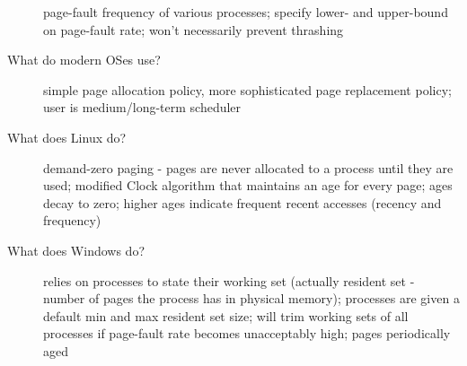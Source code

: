 \documentclass[10pt]{article}
\begin{document}
\begin{description}
  page-fault frequency of various processes;
  specify lower- and upper-bound on page-fault rate;
  won't necessarily prevent thrashing
\item[What do modern OSes use?]
  simple page allocation policy, more sophisticated page replacement policy;
  user is medium/long-term scheduler
\item[What does Linux do?]
  demand-zero paging - pages are never allocated to a process until they are used;
  modified Clock algorithm that maintains an age for every page;
  ages decay to zero; higher ages indicate frequent recent accesses (recency and frequency)
\item[What does Windows do?]
  relies on processes to state their working set (actually resident set - number of pages the process has in physical memory);
  processes are given a default min and max resident set size;
  will trim working sets of all processes if page-fault rate becomes unacceptably high; pages periodically aged
\end{description}
\end{document}
